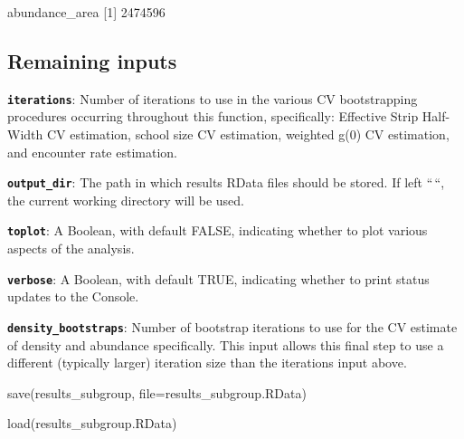 \documentclass[
]{book}
\newenvironment{Shaded}{\begin{snugshade}}{\end{snugshade}}
\newcommand{\AttributeTok}[1]{\textcolor[rgb]{0.77,0.63,0.00}{#1}}
\newcommand{\DecValTok}[1]{\textcolor[rgb]{0.00,0.00,0.81}{#1}}
\newcommand{\FunctionTok}[1]{\textcolor[rgb]{0.00,0.00,0.00}{#1}}
\newcommand{\NormalTok}[1]{#1}
\newcommand{\StringTok}[1]{\textcolor[rgb]{0.31,0.60,0.02}{#1}}
\begin{document}
\begin{Shaded}
\begin{Highlighting}[]

\NormalTok{abundance\_area}
\NormalTok{[}\DecValTok{1}\NormalTok{] }\DecValTok{2474596}
\end{Highlighting}
\end{Shaded}

\hypertarget{remaining-inputs}{%
\subsection*{Remaining inputs}\label{remaining-inputs}}

\textbf{\texttt{iterations}}: Number of iterations to use in the various CV bootstrapping procedures occurring throughout this function, specifically: Effective Strip Half-Width CV estimation, school size CV estimation, weighted g(0) CV estimation, and encounter rate estimation.

\textbf{\texttt{output\_dir}}: The path in which results RData files should be stored. If left ``\,``, the current working directory will be used.

\textbf{\texttt{toplot}}: A Boolean, with default FALSE, indicating whether to plot various aspects of the analysis.

\textbf{\texttt{verbose}}: A Boolean, with default TRUE, indicating whether to print status updates to the Console.

\textbf{\texttt{density\_bootstraps}}: Number of bootstrap iterations to use for the CV estimate of density and abundance specifically. This input allows this final step to use a different (typically larger) iteration size than the iterations input above.

\begin{Shaded}
\begin{Highlighting}[]
\FunctionTok{save}\NormalTok{(results\_subgroup, }\AttributeTok{file=}\StringTok{\textquotesingle{}results\_subgroup.RData\textquotesingle{}}\NormalTok{)}
\end{Highlighting}
\end{Shaded}

\begin{Shaded}
\begin{Highlighting}[]
\FunctionTok{load}\NormalTok{(}\StringTok{\textquotesingle{}results\_subgroup.RData\textquotesingle{}}\NormalTok{)}
\end{Highlighting}
\end{Shaded}
\end{document}
